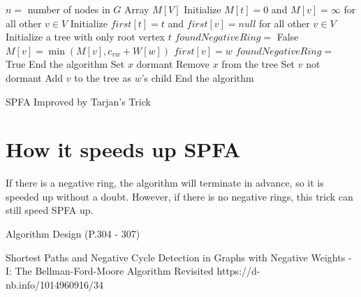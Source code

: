 \documentclass{article}
\begin{document}
\begin{algorithm}
    $n=$ number of nodes in $G$\;
    Array $M[V]$\;
    Initialize $M[t]=0$ and $M[v]=\infty$ for all other $v\in V$\;
    Initialize $first[t]=t$ and $first[v]=null$ for all other $v\in V$\;
    Initialize a tree with only root vertex $t$\;
    $foundNegativeRing=$ False\;
     {
         {
             {
                 {
                    $M[v]=\min(M[v],c_{vw}+W[w])$\;
                     {
                        $first[v]=w$\;
                         {
                             {
                                $foundNegativeRing=$ True\;
                                End the algorithm\;
                            }
                            Set $x$ dormant\;
                            Remove $x$ from the tree\;
                        }
                        Set $v$ not dormant\;
                        Add $v$ to the tree as $w$'s child\;
                    }
                }
            }
        }
         {
            End the algorithm\;
        }
    }
    \caption{SPFA Improved by Tarjan's Trick}
\end{algorithm}

\section{How it speeds up SPFA}

If there is a negative ring, the algorithm will terminate in advance, so it is speeded up without a doubt. However, if there is no negative rings, this trick can still speed SPFA up.



\newpage  %

\renewcommand\refname{References}  %
\begin{thebibliography}{99}
     Algorithm Design (P.304 - 307)

     Shortest Paths and Negative Cycle Detection in Graphs with Negative Weights - I: The Bellman-Ford-Moore Algorithm Revisited
    https://d-nb.info/1014960916/34

\end{thebibliography}
\end{document}
